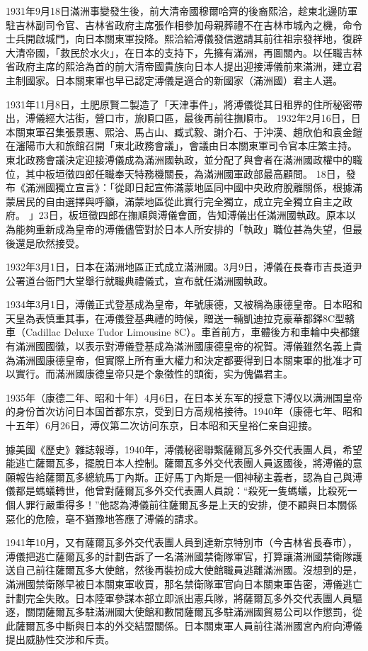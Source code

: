 1931年9月18日滿洲事變發生後，前大清帝國穆爾哈齊的後裔熙洽，趁東北邊防軍駐吉林副司令官、吉林省政府主席張作相參加母親葬禮不在吉林市城內之機，命令士兵開啟城門，向日本關東軍投降。熙洽給溥儀發信邀請其前往祖宗發祥地，復辟大清帝國，「救民於水火」，在日本的支持下，先擁有滿洲，再圖關內。以任職吉林省政府主席的熙洽為首的前大清帝國貴族向日本人提出迎接溥儀前来滿洲，建立君主制國家。日本關東軍也早已認定溥儀是適合的新國家（滿洲國）君主人選。

1931年11月8日，土肥原賢二製造了「天津事件」，將溥儀從其日租界的住所秘密帶出，溥儀經大沽街，營口市，旅順口區，最後再前往撫順市。 1932年2月16日，日本關東軍召集張景惠、熙洽、馬占山、臧式毅、謝介石、于沖漢、趙欣伯和袁金鎧在瀋陽市大和旅館召開「東北政務會議」，會議由日本關東軍司令官本庄繁主持。東北政務會議決定迎接溥儀成為滿洲國執政，並分配了與會者在滿洲國政權中的職位，其中板垣徵四郎任職奉天特務機關長，為滿洲國軍政部最高顧問。 18日，發布《滿洲國獨立宣言》：「從即日起宣佈滿蒙地區同中國中央政府脫離關係，根據滿蒙居民的自由選擇與呼籲，滿蒙地區從此實行完全獨立，成立完全獨立自主之政府。 」23日，板垣徵四郎在撫順與溥儀會面，告知溥儀出任滿洲國執政。原本以為能夠重新成為皇帝的溥儀儘管對於日本人所安排的「執政」職位甚為失望，但最後還是欣然接受。

1932年3月1日，日本在滿洲地區正式成立滿洲國。3月9日，溥儀在長春市吉長道尹公署道台衙門大堂舉行就職典禮儀式，宣布就任滿洲國執政。

1934年3月1日，溥儀正式登基成為皇帝，年號康德，又被稱為康德皇帝。日本昭和天皇為表慎重其事，在溥儀登基典禮的時候，贈送一輛凱迪拉克豪華都鐸8C型轎車（Cadillac Deluxe Tudor Limousine 8C）。車首前方，車體後方和車輪中央都鑲有滿洲國國徽，以表示對溥儀登基成為滿洲國康德皇帝的祝賀。溥儀雖然名義上貴為滿洲國康德皇帝，但實際上所有重大權力和決定都要得到日本關東軍的批准才可以實行。而滿洲國康德皇帝只是个象徵性的頭銜，实为傀儡君主。

1935年（康德二年、昭和十年）4月6日，在日本关东军的授意下溥仪以满洲国皇帝的身份首次访问日本国首都东京，受到日方高规格接待。1940年（康德七年、昭和十五年）6月26日，溥仪第二次访问东京，日本昭和天皇裕仁亲自迎接。

據美國《歷史》雜誌報導，1940年，溥儀秘密聯繫薩爾瓦多外交代表團人員，希望能逃亡薩爾瓦多，擺脫日本人控制。薩爾瓦多外交代表團人員返國後，將溥儀的意願報告給薩爾瓦多總統馬丁內斯。正好馬丁內斯是一個神秘主義者，認為自己與溥儀都是螞蟻轉世，他曾對薩爾瓦多外交代表團人員說：“殺死一隻螞蟻，比殺死一個人罪行嚴重得多！”他認為溥儀前往薩爾瓦多是上天的安排，便不顧與日本關係惡化的危險，亳不猶豫地答應了溥儀的請求。

1941年10月，又有薩爾瓦多外交代表團人員到達新京特別市（今吉林省長春市），溥儀把逃亡薩爾瓦多的計劃告訴了一名滿洲國禁衛隊軍官，打算讓滿洲國禁衛隊護送自己前往薩爾瓦多大使館，然後再裝扮成大使館職員逃離滿洲國。沒想到的是，滿洲國禁衛隊早被日本關東軍收買，那名禁衛隊軍官向日本關東軍告密，溥儀逃亡計劃完全失敗。日本陸軍參謀本部立即派出憲兵隊，將薩爾瓦多外交代表團人員驅逐，關閉薩爾瓦多駐滿洲國大使館和數間薩爾瓦多駐滿洲國貿易公司以作懲罰，從此薩爾瓦多中斷與日本的外交結盟關係。日本關東軍人員前往滿洲國宮內府向溥儀提出威胁性交涉和斥责。

